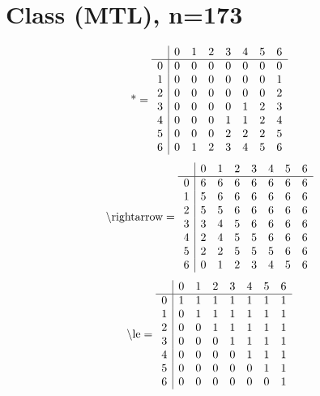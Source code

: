 \documentclass[11pt]{article}
\begin{document}
\section{Class (MTL), n=173}
\[\text{*} = 
\begin{array}{r | r r r r r r r}
 & 0 & 1 & 2 & 3 & 4 & 5 & 6 \\ \hline
0 & 0 & 0 & 0 & 0 & 0 & 0 & 0 \\
1 & 0 & 0 & 0 & 0 & 0 & 0 & 1 \\
2 & 0 & 0 & 0 & 0 & 0 & 0 & 2 \\
3 & 0 & 0 & 0 & 0 & 1 & 2 & 3 \\
4 & 0 & 0 & 0 & 1 & 1 & 2 & 4 \\
5 & 0 & 0 & 0 & 2 & 2 & 2 & 5 \\
6 & 0 & 1 & 2 & 3 & 4 & 5 & 6 \\
\end{array}
\]
\[\text{\textbackslash rightarrow} = 
\begin{array}{r | r r r r r r r}
 & 0 & 1 & 2 & 3 & 4 & 5 & 6 \\ \hline
0 & 6 & 6 & 6 & 6 & 6 & 6 & 6 \\
1 & 5 & 6 & 6 & 6 & 6 & 6 & 6 \\
2 & 5 & 5 & 6 & 6 & 6 & 6 & 6 \\
3 & 3 & 4 & 5 & 6 & 6 & 6 & 6 \\
4 & 2 & 4 & 5 & 5 & 6 & 6 & 6 \\
5 & 2 & 2 & 5 & 5 & 5 & 6 & 6 \\
6 & 0 & 1 & 2 & 3 & 4 & 5 & 6 \\
\end{array}
\]
\[\text{\textbackslash le} = 
\begin{array}{r | r r r r r r r}
 & 0 & 1 & 2 & 3 & 4 & 5 & 6 \\ \hline
0 & 1 & 1 & 1 & 1 & 1 & 1 & 1 \\
1 & 0 & 1 & 1 & 1 & 1 & 1 & 1 \\
2 & 0 & 0 & 1 & 1 & 1 & 1 & 1 \\
3 & 0 & 0 & 0 & 1 & 1 & 1 & 1 \\
4 & 0 & 0 & 0 & 0 & 1 & 1 & 1 \\
5 & 0 & 0 & 0 & 0 & 0 & 1 & 1 \\
6 & 0 & 0 & 0 & 0 & 0 & 0 & 1 \\
\end{array}
\]
\end{document}
